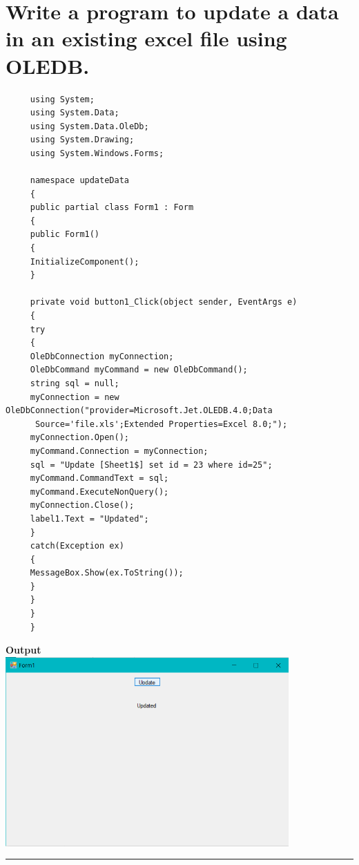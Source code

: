 \documentclass[11pt,dvipsnames,cmyk]{article}
\begin{document}
	 \section*{Write a program to update a data in an existing excel file using OLEDB.}
	 \begin{verbatim}
	 using System;
	 using System.Data;
	 using System.Data.OleDb;
	 using System.Drawing;
	 using System.Windows.Forms;
	 
	 namespace updateData
	 {
	 public partial class Form1 : Form
	 {
	 public Form1()
	 {
	 InitializeComponent();
	 }
	 
	 private void button1_Click(object sender, EventArgs e)
	 {
	 try
	 {
	 OleDbConnection myConnection;
	 OleDbCommand myCommand = new OleDbCommand();
	 string sql = null;
	 myConnection = new OleDbConnection("provider=Microsoft.Jet.OLEDB.4.0;Data
	  Source='file.xls';Extended Properties=Excel 8.0;");
	 myConnection.Open();
	 myCommand.Connection = myConnection;
	 sql = "Update [Sheet1$] set id = 23 where id=25";
	 myCommand.CommandText = sql;
	 myCommand.ExecuteNonQuery();
	 myConnection.Close();
	 label1.Text = "Updated";
	 }
	 catch(Exception ex)
	 {
	 MessageBox.Show(ex.ToString());
	 }
	 }
	 }
	 }
	 \end{verbatim}
	 \begin{center}
	 	\textbf{Output}\\
	 	\hfill\break\includegraphics[width=4.27in]{9.png}
	 \end{center}
	 \rule{6.27in}{1.2pt}
	 
\end{document}
